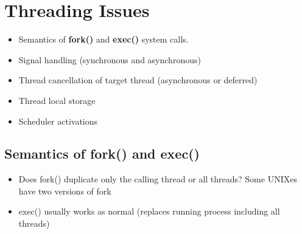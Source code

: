 \documentclass[oneside]{book}
\begin{document}
        \section{Threading Issues}
            \begin{itemize}
                \item Semantics of \textbf{fork()} and \textbf{exec()} system calls.
                \item Signal handling (synchronous and asynchronous)
                \item Thread cancellation of target thread (asynchronous or deferred)
                \item Thread local storage
                \item Scheduler activations
            \end{itemize}
            \subsection{Semantics of fork() and exec()}
                \begin{itemize}
                    \item Does fork() duplicate only the calling thread or all threads?
                        \subitem Some UNIXes have two versions of fork
                    \item exec() usually works as normal (replaces running process including all threads)
                \end{itemize}
\end{document}

